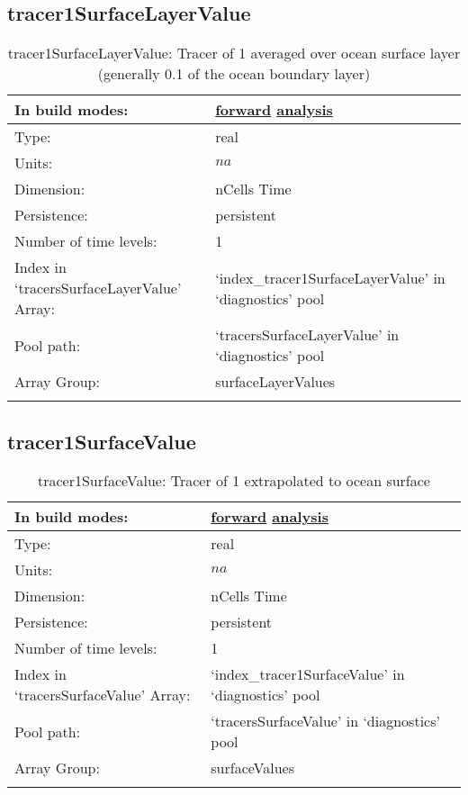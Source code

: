 \subsection[tracer1SurfaceLayerValue]{tracer1SurfaceLayerValue}
\label{subsec:var_sec_diagnostics_tracer1SurfaceLayerValue}
\begin{center}
\begin{longtable}{| p{2.0in} | p{4.0in} |}
        \hline 
        In build modes: & \hyperref[subsec:forward_var_tab_diagnostics]{forward} \hyperref[subsec:analysis_var_tab_diagnostics]{analysis} \\
        \hline 
        Type: & real \\
        \hline 
        Units: & $na$ \\
        \hline 
        Dimension: & nCells Time \\
        \hline 
        Persistence: & persistent \\
        \hline 
        Number of time levels: & 1 \\
        \hline 
		 Index in `tracersSurfaceLayerValue' Array: & `index\_tracer1SurfaceLayerValue' in `diagnostics' pool \\
		 \hline 
            Pool path: & `tracersSurfaceLayerValue' in `diagnostics' pool \\
		 \hline 
		 Array Group: & surfaceLayerValues \\
		 \hline 
    \caption{tracer1SurfaceLayerValue: Tracer of 1 averaged over ocean surface layer (generally 0.1 of the ocean boundary layer)}
\end{longtable}
\end{center}
\subsection[tracer1SurfaceValue]{tracer1SurfaceValue}
\label{subsec:var_sec_diagnostics_tracer1SurfaceValue}
\begin{center}
\begin{longtable}{| p{2.0in} | p{4.0in} |}
        \hline 
        In build modes: & \hyperref[subsec:forward_var_tab_diagnostics]{forward} \hyperref[subsec:analysis_var_tab_diagnostics]{analysis} \\
        \hline 
        Type: & real \\
        \hline 
        Units: & $na$ \\
        \hline 
        Dimension: & nCells Time \\
        \hline 
        Persistence: & persistent \\
        \hline 
        Number of time levels: & 1 \\
        \hline 
		 Index in `tracersSurfaceValue' Array: & `index\_tracer1SurfaceValue' in `diagnostics' pool \\
		 \hline 
            Pool path: & `tracersSurfaceValue' in `diagnostics' pool \\
		 \hline 
		 Array Group: & surfaceValues \\
		 \hline 
    \caption{tracer1SurfaceValue: Tracer of 1 extrapolated to ocean surface}
\end{longtable}
\end{center}
